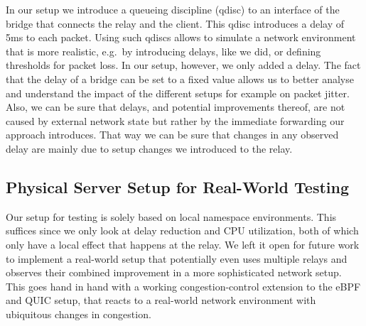 
In our setup we introduce a queueing discipline (qdisc) to an interface
of the bridge that connects the relay and the client.
This qdisc introduces a delay of 5ms to each packet.
Using such qdiscs allows to simulate a network environment that is more realistic, 
e.g.~by introducing delays, like we did, or defining thresholds for packet loss.
In our setup, however, we only added a delay. %
The fact that the delay of a bridge can be set to a fixed value allows us to better 
analyse and understand the impact of the different setups for example on packet jitter.
Also, we can be sure that delays, and potential improvements thereof, are not caused by external
network state but rather by the immediate forwarding our approach introduces.
That way we can be sure that changes in any observed delay are mainly due to setup changes 
we introduced to the relay.

\subsection{Physical Server Setup for Real-World Testing}\label{subsec:physical_server_setup}
Our setup for testing is solely based on local namespace environments.
This suffices since we only look at delay reduction and CPU utilization, 
both of which only have a local effect that happens at the relay.
We left it open for future work to implement a real-world setup that 
potentially even uses multiple relays and observes their combined improvement
in a more sophisticated network setup.
This goes hand in hand with a working congestion-control extension to the eBPF and 
QUIC setup, that reacts to a real-world network environment with ubiquitous changes 
in congestion.
